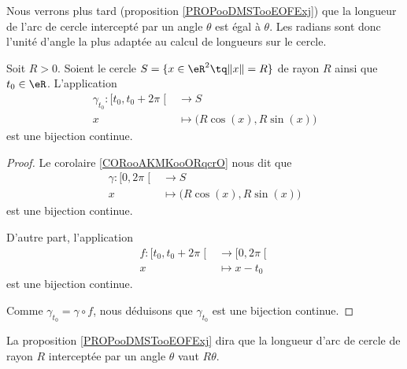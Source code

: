 Nous verrons plus tard (proposition \ref{PROPooDMSTooEOFExj}) que la longueur de l'arc de cercle intercepté par un angle \( \theta\) est égal à \( \theta\). Les radians sont donc l'unité d'angle la plus adaptée au calcul de longueurs sur le cercle.

\begin{lemma}       \label{LEMooXISFooRMWUEC}
	Soit \( R>0\). Soient le cercle \( S=\{ x\in \eR^2\tq \| x \|=R \}\) de rayon \( R\) ainsi que \( t_0\in \eR\). L'application
	\begin{equation}
		\begin{aligned}
			\gamma_{t_0}\colon \mathopen[ t_0 , t_0+2\pi \mathclose[ & \to S                                 \\
			x                                                        & \mapsto \big( R\cos(x),R\sin(x) \big)
		\end{aligned}
	\end{equation}
	est une bijection continue.
\end{lemma}

\begin{proof}
	Le corolaire \ref{CORooAKMKooORqcrO} nous dit que
	\begin{equation}
		\begin{aligned}
			\gamma\colon \mathopen[ 0 , 2\pi \mathclose[ & \to S                                 \\
			x                                            & \mapsto \big( R\cos(x),R\sin(x) \big)
		\end{aligned}
	\end{equation}
	est une bijection continue.

	D'autre part, l'application
	\begin{equation}
		\begin{aligned}
			f\colon \mathopen[ t_0 , t_0+2\pi \mathclose[ & \to \mathopen[ 0 , 2\pi \mathclose[ \\
			x                                             & \mapsto x-t_0
		\end{aligned}
	\end{equation}
	est une bijection continue.

	Comme \( \gamma_{t_0}=\gamma\circ f\), nous déduisons que \( \gamma_{t_0}\) est une bijection continue.
\end{proof}

\begin{normaltext}
	La proposition \ref{PROPooDMSTooEOFExj} dira que la longueur d'arc de cercle de rayon \( R\) interceptée par un angle \( \theta\) vaut \( R\theta\).
\end{normaltext}

